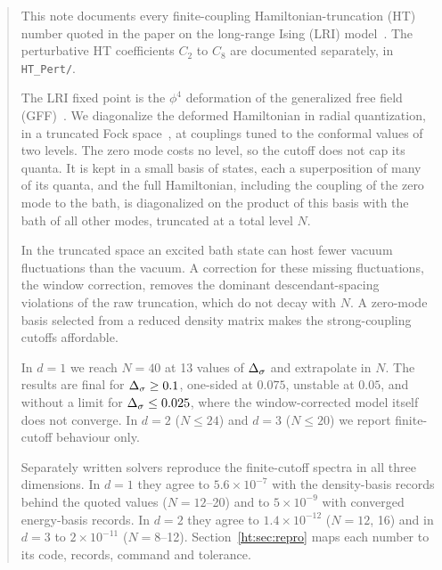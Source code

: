 


\begin{abstract}
This note documents every finite-coupling Hamiltonian-truncation (HT) number quoted in the paper on the long-range
Ising (LRI) model~\cite{ht:paper}. The perturbative HT coefficients $C_2$ to $C_8$ are documented separately, in
\texttt{HT\_Pert/}.

The LRI fixed point is the $\phi^4$ deformation of the generalized free field (GFF)~\cite{ht:Fisher:1972zz,ht:Sak:1973oqx,ht:Paulos:2015jfa}.
We diagonalize the deformed Hamiltonian in radial quantization, in a truncated Fock space~\cite{ht:Hogervorst:2014rta,ht:Rychkov:2014eea},
at couplings tuned to the conformal values of two levels. The zero mode costs no level, so the cutoff does not cap
its quanta. It is kept in a small basis of states, each a superposition of many of its quanta, and the full
Hamiltonian, including the coupling of the zero mode to the bath, is diagonalized on the product of this basis with
the bath of all other modes, truncated at a total level $N$.

In the truncated space an excited bath state can host fewer vacuum fluctuations than the vacuum. A correction for
these missing fluctuations, the window correction, removes the dominant descendant-spacing violations of the raw
truncation, which do not decay with $N$. A zero-mode basis selected from a reduced density matrix makes the
strong-coupling cutoffs affordable.

In $d=1$ we reach $N=40$ at 13 values of $\Ds$ and extrapolate in $N$. The results are final for
$\Ds\geq0.1$, one-sided at $0.075$, unstable at $0.05$, and without a limit for $\Ds\leq0.025$, where the
window-corrected model itself does not converge. In $d=2$ ($N\leq24$) and $d=3$ ($N\leq20$) we report
finite-cutoff behaviour only.

Separately written solvers reproduce the finite-cutoff spectra in all three dimensions. In $d=1$ they agree to
$5.6\times10^{-7}$ with the density-basis records behind the quoted values ($N=12$--20) and to $5\times10^{-9}$ with
converged energy-basis records. In $d=2$ they agree to $1.4\times10^{-12}$ ($N=12$, 16) and in $d=3$ to
$2\times10^{-11}$ ($N=8$--12). Section~\ref{ht:sec:repro} maps each number to its code, records, command and tolerance.
\end{abstract}












\appendix


